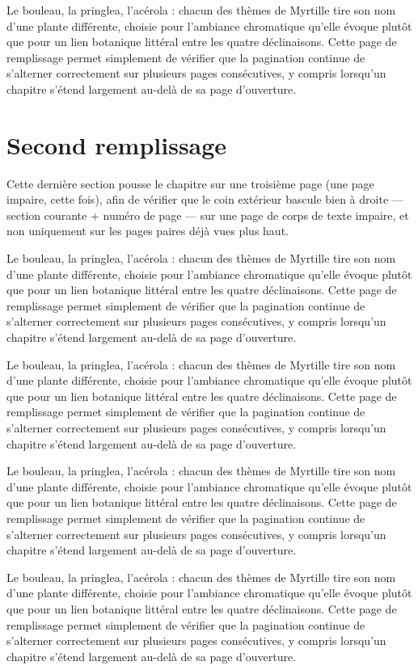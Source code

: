 \documentclass[theme=pringlea]{myrtillebook}
\begin{document}
Le bouleau, la pringlea, l'acérola : chacun des thèmes de Myrtille tire son nom d'une plante différente, choisie pour l'ambiance chromatique qu'elle évoque plutôt que pour un lien botanique littéral entre les quatre déclinaisons. Cette page de remplissage permet simplement de vérifier que la pagination continue de s'alterner correctement sur plusieurs pages consécutives, y compris lorsqu'un chapitre s'étend largement au-delà de sa page d'ouverture.

\section{Second remplissage}
Cette dernière section pousse le chapitre sur une troisième page (une page impaire, cette fois), afin de vérifier que le coin extérieur bascule bien à droite — section courante + numéro de page — sur une page de corps de texte impaire, et non uniquement sur les pages paires déjà vues plus haut.

Le bouleau, la pringlea, l'acérola : chacun des thèmes de Myrtille tire son nom d'une plante différente, choisie pour l'ambiance chromatique qu'elle évoque plutôt que pour un lien botanique littéral entre les quatre déclinaisons. Cette page de remplissage permet simplement de vérifier que la pagination continue de s'alterner correctement sur plusieurs pages consécutives, y compris lorsqu'un chapitre s'étend largement au-delà de sa page d'ouverture.

Le bouleau, la pringlea, l'acérola : chacun des thèmes de Myrtille tire son nom d'une plante différente, choisie pour l'ambiance chromatique qu'elle évoque plutôt que pour un lien botanique littéral entre les quatre déclinaisons. Cette page de remplissage permet simplement de vérifier que la pagination continue de s'alterner correctement sur plusieurs pages consécutives, y compris lorsqu'un chapitre s'étend largement au-delà de sa page d'ouverture.

Le bouleau, la pringlea, l'acérola : chacun des thèmes de Myrtille tire son nom d'une plante différente, choisie pour l'ambiance chromatique qu'elle évoque plutôt que pour un lien botanique littéral entre les quatre déclinaisons. Cette page de remplissage permet simplement de vérifier que la pagination continue de s'alterner correctement sur plusieurs pages consécutives, y compris lorsqu'un chapitre s'étend largement au-delà de sa page d'ouverture.

Le bouleau, la pringlea, l'acérola : chacun des thèmes de Myrtille tire son nom d'une plante différente, choisie pour l'ambiance chromatique qu'elle évoque plutôt que pour un lien botanique littéral entre les quatre déclinaisons. Cette page de remplissage permet simplement de vérifier que la pagination continue de s'alterner correctement sur plusieurs pages consécutives, y compris lorsqu'un chapitre s'étend largement au-delà de sa page d'ouverture.
\end{document}
